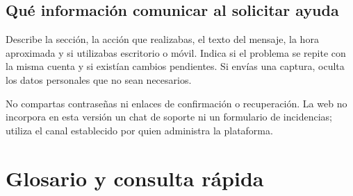 \documentclass[12pt,letterpaper]{article}
\begin{document}
\subsection{Qué información comunicar al solicitar ayuda}
Describe la sección, la acción que realizabas, el texto del mensaje, la hora aproximada y si utilizabas escritorio o móvil. Indica si el problema se repite con la misma cuenta y si existían cambios pendientes. Si envías una captura, oculta los datos personales que no sean necesarios.

No compartas contraseñas ni enlaces de confirmación o recuperación. La web no incorpora en esta versión un chat de soporte ni un formulario de incidencias; utiliza el canal establecido por quien administra la plataforma.
\clearpage
\section{Glosario y consulta rápida}
\end{document}

